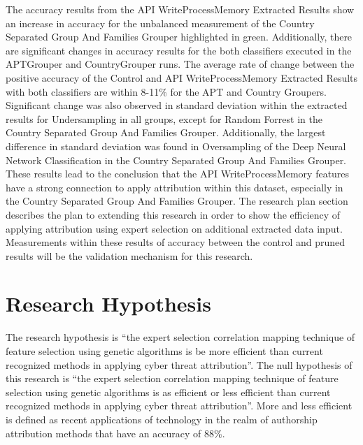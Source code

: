 \documentclass[12pt]{report}
\begin{document}
The accuracy results from the API WriteProcessMemory Extracted Results show an increase in accuracy for the unbalanced measurement of the Country Separated Group And Families Grouper highlighted in green.  Additionally, there are significant changes in accuracy results for the both classifiers executed in the APTGrouper and CountryGrouper runs.  The average rate of change between the positive accuracy of the Control and API WriteProcessMemory Extracted Results with both classifiers are within 8-11\% for the APT and Country Groupers.  Significant change was also observed in standard deviation within the extracted results for Undersampling in all groups, except for Random Forrest in the Country Separated Group And Families Grouper.  Additionally, the largest difference in standard deviation was found in Oversampling of the Deep Neural Network Classification in the Country Separated Group And Families Grouper.  These results lead to the conclusion that the API WriteProcessMemory features have a strong connection to apply attribution within this dataset, especially in the Country Separated Group And Families Grouper.  The research plan section describes the plan to extending this research in order to show the efficiency of applying attribution using expert selection on additional extracted data input.  Measurements within these results of accuracy between the control and pruned results will be the validation mechanism for this research.

\section{Research Hypothesis} 
The research hypothesis is ``the expert selection correlation mapping technique of feature selection using genetic algorithms is be more efficient than current recognized methods in applying cyber threat attribution''. The null hypothesis of this research is ``the expert selection correlation mapping technique of feature selection using genetic algorithms is as efficient or less efficient than current recognized methods in applying cyber threat attribution''.  More and less efficient is defined as recent applications of technology in the realm of authorship attribution methods that have an accuracy of 88\%.

\end{document}

